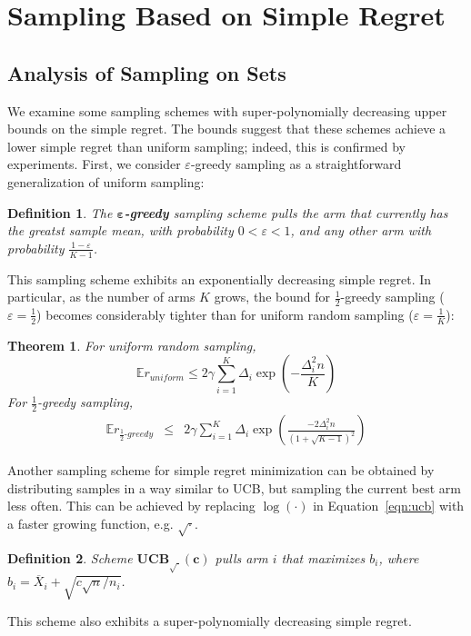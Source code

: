 \documentclass[letterpaper]{article}
\newcommand {\IE} {\ensuremath {\mathbb{E}}}
\newtheorem{dfn}{Definition}
\newtheorem{thm}{Theorem}
\begin{document}
\section{Sampling Based on Simple Regret}
\label{sec:results}

\subsection{Analysis of Sampling on Sets}
\label{sec:sampling-on-sets}


We examine some sampling schemes with super-polynomially
decreasing upper bounds on the simple regret. The bounds
suggest that these schemes achieve a lower simple regret
than uniform sampling; indeed, this is confirmed
by experiments. First, we consider $\varepsilon$-greedy sampling as a straightforward
generalization of uniform sampling:
\begin{dfn} The \textbf{$\mathbf{\varepsilon}$-greedy} sampling scheme
pulls the arm that currently has the greatst sample mean, with probability
$0<\varepsilon<1$, and any other
arm with probability $\frac {1-\varepsilon} {K-1}$. 
\end{dfn}
This sampling scheme exhibits an exponentially decreasing simple
regret.
In particular, as the number of arms $K$ grows, the bound for $\frac 1
2$-greedy sampling ($\varepsilon=\frac 1 2$) becomes considerably tighter than for uniform
random sampling ($\varepsilon=\frac 1 K$):
\begin{thm}
For uniform random sampling, 
\begin{equation}
\IE r_{uniform}\le 2\gamma \sum_{i=1}^K\Delta_i\exp\left(-\frac {\Delta_i^2n} {K}\right)
\end{equation}
For $\frac 1 2$-greedy sampling,
\begin{eqnarray}
\IE r_{\frac 1 2\mbox{-}greedy}&\le& 2\gamma \sum_{i=1}^K\Delta_i\exp\left(\frac {-2\Delta_i^2n}
  {\left(1+\sqrt{K-1}\right)^2}\right)
\end{eqnarray}
\end{thm}

Another sampling scheme for simple regret minimization can be obtained
by distributing samples in a way similar to UCB, but sampling the current best arm
less often. This can be achieved by replacing $\log(\cdot)$ in
Equation~\ref{eqn:ucb} with a faster growing function, e.g. $\sqrt\cdot$.
\begin{dfn} Scheme $\mathbf{UCB_{\sqrt{\cdot}}(c)}$ pulls arm $i$ that
maximizes $b_i$, where $b_i=\overline X_i+\sqrt {{c \sqrt n} / {n_i}}$.
\end{dfn}
This scheme also exhibits a super-polynomially decreasing simple regret.
\end{document}
